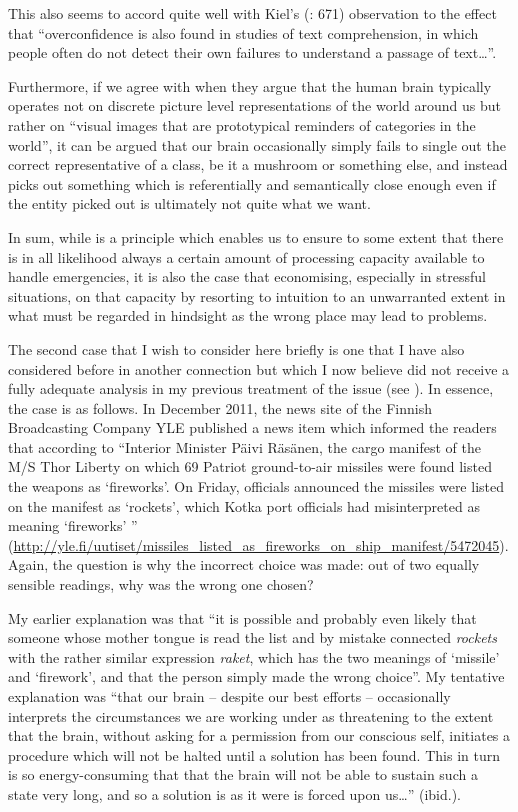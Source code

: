 \documentclass[output=paper]{LSP/langsci}
\begin{document}
  This also seems to accord quite well with Kiel's (\citeyear{Kiel2003}: 671) observation to the effect that ``overconfidence is also found in studies of text comprehension, in which people often do not detect their own failures to understand a passage of text\ldots''.

   Furthermore, if we agree with \citet[359]{Baars2010} when they argue that the human brain typically operates not on discrete picture level representations of the world around us but rather on ``visual images that are prototypical reminders of categories in the world'', it can be argued that our brain occasionally simply fails to single out the correct representative of a class, be it a mushroom or something else, and instead picks out something which is referentially and semantically close enough even if the entity picked out is ultimately not quite what we want. 

  In sum, while  is a principle which enables us to ensure to some extent that there is in all likelihood always a certain amount of processing capacity available to handle emergencies, it is also the case that economising, especially in stressful situations, on that capacity by resorting to intuition to an unwarranted extent in what must be regarded in hindsight as the wrong place may lead to problems.

  The second case that I wish to consider here briefly is one that I have also considered before in another connection but which I now believe did not receive a fully adequate analysis in my previous treatment of the issue (see \citealt{Hietaranta2014}). In essence, the case is as follows. In December 2011, the news site of the Finnish Broadcasting Company YLE published a news item which informed the readers that according to ``Interior Minister Päivi Räsänen, the cargo manifest of the M/S Thor Liberty on which 69 Patriot ground-to-air missiles were found listed the weapons as `fireworks'. On Friday, officials announced the missiles were listed on the manifest as `rockets', which Kotka port officials had misinterpreted as meaning `fireworks' '' (\url{http://yle.fi/uutiset/missiles\_listed\_as\_fireworks\_on\_ship\_manifest/5472045}). Again, the question is why the incorrect choice was made: out of two equally sensible readings, why was the wrong one chosen?

  My earlier explanation was that ``it is possible and probably even likely that someone whose mother tongue is  read the list and by mistake connected \textit{rockets} with the rather similar  expression \textit{raket}, which has the two meanings of `missile' and `firework', and that the person simply made the wrong choice''. My tentative explanation was ``that our brain -- despite our best efforts -- occasionally interprets the circumstances we are working under as threatening to the extent that the brain, without asking for a permission from our conscious self, initiates a procedure which will not be halted until a solution has been found. This in turn is so energy-consuming that that the brain will not be able to sustain such a state very long, and so a solution is as it were is forced upon us\ldots'' (ibid.).
\end{document}
